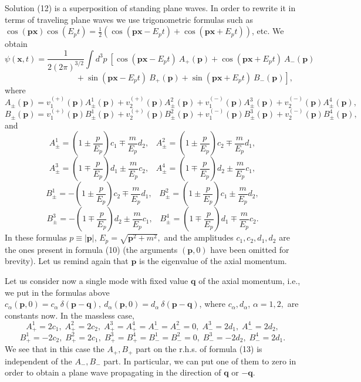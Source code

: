 \documentclass[12pt]{article}
\begin{document}
Solution (12)  is a superposition of standing plane waves.  In order to rewrite it in terms of traveling plane waves we 
use  trigonometric formulas such as $   \cos(\mathbf{p}\mathbf{x}) \cos(E_pt) = \frac{1}{2} (\cos(\mathbf{p}\mathbf{x} - E_p t) + \cos(\mathbf{p}\mathbf{x} + E_p t))$, etc.  We  obtain
\begin{equation}
\psi(\mathbf{x}, t) = \frac{1}{2(2\pi)^{3/2}} \int\!d^3p\: \left[ \cos(\mathbf{p}\mathbf{x} - E_pt) \: A_+(\mathbf{p})  + \cos(\mathbf{p}\mathbf{x} + E_pt) \:A_-(\mathbf{p})  \right. 
\end{equation} 
\[  \left.   \;\;\;\;\;\;\;\;\;\;\;\;\;\; \;\;\;\;\;\;\;\;\;\;\;\;\;\; +\sin(\mathbf{p}\mathbf{x} - E_pt) \: B_+(\mathbf{p})  + \sin(\mathbf{p}\mathbf{x} + E_pt) \:B_-(\mathbf{p}) \right], \] 
where 
\[ A_{\pm}(\mathbf{p}) = v^{(+)}_1(\mathbf{p}) A^{1}_{\pm}(\mathbf{p})  +v^{(+)}_2(\mathbf{p}) A^{2}_{\pm}(\mathbf{p}) +v^{(-)}_1(\mathbf{p}) A^{3}_{\pm}(\mathbf{p}) +v^{(-)}_2(\mathbf{p}) A^{4}_{\pm}(\mathbf{p}),   \]  
\[ B_{\pm}(\mathbf{p}) = v^{(+)}_1(\mathbf{p}) B^{1}_{\pm}(\mathbf{p})  +v^{(+)}_2(\mathbf{p}) B^{2}_{\pm}(\mathbf{p}) +v^{(-)}_1(\mathbf{p}) B^{3}_{\pm}(\mathbf{p}) +v^{(-)}_2(\mathbf{p}) B^{4}_{\pm}(\mathbf{p}),   \]  
and 
\[ A^{1}_{\pm} =   (1 \pm \frac{p}{E_p})  c_1   \mp   \frac{m}{E_p} d_2,  \;\;\; A^{2}_{\pm} =   (1 \pm \frac{p}{E_p}) c_2  \mp  \frac{m}{E_p} d_1, \] 
\[  A^{3}_{\pm} =   (1 \mp \frac{p}{E_p}) d_1   \pm   \frac{m}{E_p} c_2, \;\;\;  A^{4}_{\pm} =  (1 \mp \frac{p}{E_p}) d_2   \pm   \frac{m}{E_p} c_1, \]
\[ B^{1}_{\pm} =  -  (1 \pm \frac{p}{E_p})  c_2   \mp   \frac{m}{E_p} d_1,  \;\;\; B^{2}_{\pm} =   (1 \pm \frac{p}{E_p}) c_1  \pm  \frac{m}{E_p} d_2, \] 
\[  B^{3}_{\pm} = -  (1 \mp \frac{p}{E_p}) d_2   \pm   \frac{m}{E_p} c_1, \;\;\;  B^{4}_{\pm} =  (1 \mp \frac{p}{E_p}) d_1   \mp   \frac{m}{E_p} c_2. \]
In these formulas $p \equiv |\mathbf{p}|$,  $E_p = \sqrt{\mathbf{p}^2+ m^2}, $  and the amplitudes  $c_1,  c_2, d_{1},  d_2$ are the ones present in formula (10) (the arguments $(\mathbf{p}, 0)$ have been omitted for brevity).  Let us remind again that $\mathbf{p}$ is the eigenvalue of the axial momentum. 


Let us  consider now  a single mode with fixed value $\mathbf{q}$ of the axial  momentum, i.e., we put in the formulas above $c_{\alpha}(\mathbf{p},0) = c_{\alpha}\: \delta(\mathbf{p}- \mathbf{q}), \:d_{\alpha}(\mathbf{p},0) =  d_{\alpha}\: \delta(\mathbf{p}- \mathbf{q})$, where $c_{\alpha}, d_{\alpha}$, $\alpha=1,2,$ are constants now.  In the massless case,
\[ A^1_+ = 2c_1, \; A^2_+ = 2c_2, \;  A^3_+= A^4_+=  A^1_- =A^2_- =0, \;A^3_- = 2d_1, \; A^4_- = 2d_2, \] 
\[ B^1_+ =- 2c_2, \; B^2_+ = 2c_1, \;  B^3_+= B^4_+=  B^1_- =B^2_- =0, \;B^3_- =-2d_2, \; B^4_- = 2d_1. \] 
We see that in this case the $A_+, B_+$ part   on the r.h.s. of formula (13)  is independent of the  $A_-, B_-$ part. In particular,   we can put one of them to zero in order  to obtain a plane wave propagating in the direction of $\mathbf{q}$  or $-\mathbf{q}$.  
\end{document}
